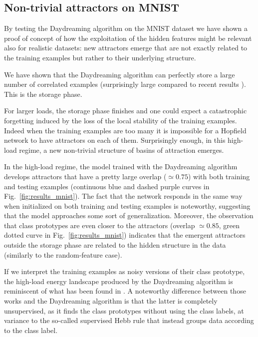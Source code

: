 \documentclass[a4paper]{cas-sc}
\begin{document}
\subsection{Non-trivial attractors on MNIST}
By testing the Daydreaming algorithm on the MNIST dataset we have shown a proof of concept of how the exploitation of the hidden features might be relevant also for realistic datasets: new attractors emerge that are not exactly related to the training examples but rather to their underlying structure.

We have shown that the Daydreaming algorithm can perfectly store a large number of correlated examples (surprisingly large compared to recent results \cite{agliari2023regularization,nouri2023eigen}). This is the storage phase.

For larger loads, the storage phase finishes and one could expect a catastrophic forgetting induced by the loss of the local stability of the training examples. Indeed when the training examples are too many it is impossible for a Hopfield network to have attractors on each of them.
Surprisingly enough, in this high-load regime, a new non-trivial structure of basins of attraction emerges.

In the high-load regime, the model trained with the Daydreaming algorithm develops attractors that have a pretty large overlap ($\simeq 0.75$) with both training and testing examples (continuous blue and dashed purple curves in Fig.~\ref{fig:results_mnist}). The fact that the network responds in the same way when initialized on both training and testing examples is noteworthy, suggesting that the model approaches some sort of generalization. Moreover, the observation that class prototypes are even closer to the attractors (overlap $\simeq 0.85$, green dotted curve in Fig.~\ref{fig:results_mnist}) indicates that the emergent attractors outside the storage phase are related to the hidden structure in the data (similarly to the random-feature case).

If we interpret the training examples as noisy versions of their class prototype, the high-load energy landscape produced by the Daydreaming algorithm is reminiscent of what has been found in \cite{agliari2023regularization,alemanno2023supervised}.
A noteworthy difference between those works and the Daydreaming algorithm is that the latter is completely unsupervised, as it finds the class prototypes without using the class labels, at variance to the so-called supervised Hebb rule that instead groups data according to the class label.
\end{document}
